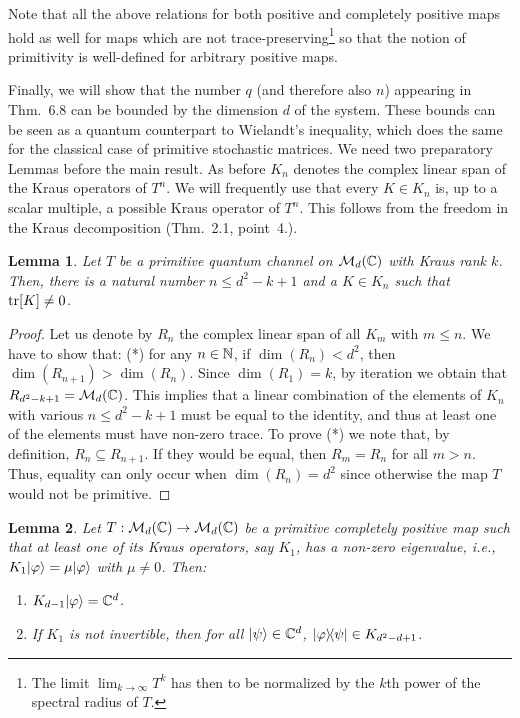 \documentclass[11pt,a4paper]{article}
\theoremstyle{plain}
\newtheorem{lemma}{Lemma}[section]
\theoremstyle{definition}
\theoremstyle{remark}
\begin{document}
Note that all the above relations for both positive and completely positive maps
hold as well for maps which are not trace-preserving\footnote{The limit
    $\lim_{k\to\infty}T^k$ has then to be normalized by the $k$th power of the
    spectral radius of $T$.} so that the notion of primitivity is well-defined for
arbitrary positive maps.

Finally, we will show that the number $q$ (and therefore also $n$) appearing in
Thm.~6.8 can be bounded by the dimension $d$ of the system. These bounds can be
seen as a quantum counterpart to Wielandt's inequality, which does the same for
the classical case of primitive stochastic matrices. We need two preparatory
Lemmas before the main result. As before $K_n$ denotes the complex linear span
of the Kraus operators of $T^n$. We will frequently use that every $K\in K_n$ is,
up to a scalar multiple, a possible Kraus operator of $T^n$. This follows from
the freedom in the Kraus decomposition (Thm.~2.1, point~4.).

\begin{lemma}
    Let $T$ be a primitive quantum channel on $\mathcal{M}_d(\mathbb{C})$ with Kraus rank $k$. Then,
    there is a natural number $n\le d^2-k+1$ and a $K\in K_n$ such that $\operatorname{tr}[K]\neq 0$.
\end{lemma}

\begin{proof}
    Let us denote by $R_n$ the complex linear span of all $K_m$ with $m\le n$. We have
    to show that: (*) for any $n\in\mathbb{N}$, if $\dim(R_n)<d^2$, then
    $\dim(R_{n+1})>\dim(R_n)$. Since $\dim(R_1)=k$, by iteration we obtain that
    $R_{d^2-k+1}=\mathcal{M}_d(\mathbb{C})$. This implies that a linear combination of the elements
    of $K_n$ with various $n\le d^2-k+1$ must be equal to the identity, and thus at
    least one of the elements must have non-zero trace. To prove (*) we note that,
    by definition, $R_n\subseteq R_{n+1}$. If they would be equal, then $R_m=R_n$ for
    all $m>n$. Thus, equality can only occur when $\dim(R_n)=d^2$ since otherwise
    the map $T$ would not be primitive.
\end{proof}

\begin{lemma}
    Let $T:\mathcal{M}_d(\mathbb{C})\to\mathcal{M}_d(\mathbb{C})$ be a primitive completely positive map such that
    at least one of its Kraus operators, say $K_1$, has a non-zero eigenvalue, i.e.,
    $K_1|\varphi\rangle=\mu|\varphi\rangle$ with $\mu\neq 0$. Then:
    \begin{enumerate}
        \item[(a)] $K_{d-1}|\varphi\rangle=\mathbb{C}^d$.
        \item[(b)] If $K_1$ is not invertible, then for all $|\psi\rangle\in\mathbb{C}^d$,
              $|\varphi\rangle\!\langle\psi|\in K_{d^2-d+1}$.
    \end{enumerate}
\end{lemma}
\end{document}
